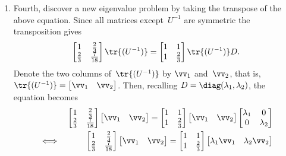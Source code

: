 \begin{draft}
\begin{example}
\begin{solution}
\begin{enumerate}
\item \label{eg:2expfitd}
Fourth, discover a new eigenvalue problem by taking the transpose of the above equation. 
Since all matrices except~\(U^{-1}\) are symmetric the transposition gives
\begin{equation*}
\begin{bmatrix} 1&\tfrac23\\\tfrac23&\frac7{18} \end{bmatrix}\tr{(U^{-1})}
=\begin{bmatrix} 1&1\\1&\tfrac23 \end{bmatrix}\tr{(U^{-1})}D.
\end{equation*}
Denote the two columns of~\(\tr{(U^{-1})}\) by \(\vv_1\) and~\(\vv_2\), that is, \(\tr{(U^{-1})}=\begin{bmatrix} \vv_1&\vv_2 \end{bmatrix}\).
Then, recalling \(D=\diag(\lambda_1,\lambda_2)\), the equation becomes
\begin{eqnarray*}
&&\begin{bmatrix} 1&\tfrac23\\\tfrac23&\frac7{18} \end{bmatrix}\begin{bmatrix} \vv_1&\vv_2 \end{bmatrix}
=\begin{bmatrix} 1&1\\1&\tfrac23 \end{bmatrix}\begin{bmatrix} \vv_1&\vv_2 \end{bmatrix}
\begin{bmatrix} \lambda_1&0\\0&\lambda_2 \end{bmatrix}
\\\iff&&
\begin{bmatrix} 1&\tfrac23\\\tfrac23&\frac7{18} \end{bmatrix}\begin{bmatrix} \vv_1&\vv_2 \end{bmatrix}
=\begin{bmatrix} 1&1\\1&\tfrac23 \end{bmatrix}\begin{bmatrix} \lambda_1\vv_1&\lambda_2\vv_2 \end{bmatrix}

\end{eqnarray*}
\end{enumerate}
\end{solution}
\end{example}
\end{draft}
